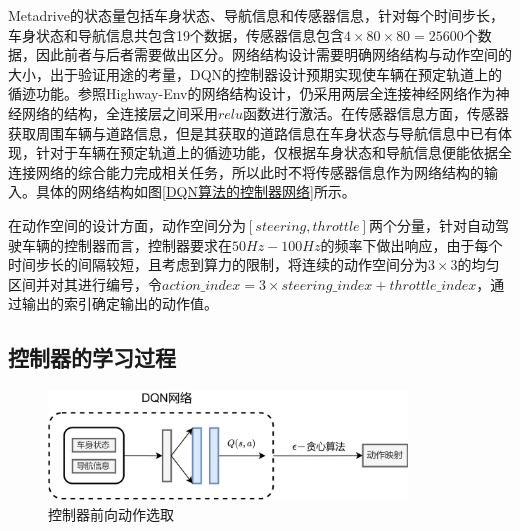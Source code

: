 Metadrive的状态量包括车身状态、导航信息和传感器信息，针对每个时间步长，车身状态和导航信息共包含19个数据，传感器信息包含$4\times80\times80=25600$个数据，因此前者与后者需要做出区分。网络结构设计需要明确网络结构与动作空间的大小，出于验证用途的考量，DQN的控制器设计预期实现使车辆在预定轨道上的循迹功能。参照Highway-Env的网络结构设计，仍采用两层全连接神经网络作为神经网络的结构，全连接层之间采用$relu$函数进行激活。在传感器信息方面，传感器获取周围车辆与道路信息，但是其获取的道路信息在车身状态与导航信息中已有体现，针对于车辆在预定轨道上的循迹功能，仅根据车身状态和导航信息便能依据全连接网络的综合能力完成相关任务，所以此时不将传感器信息作为网络结构的输入。具体的网络结构如图\ref{DQN算法的控制器网络}所示。

\begin{table}[htbp]
    \caption{控制器动作空间}\label{控制器动作空间}
    \centering
    \renewcommand\arraystretch{1.5}
\end{table}

在动作空间的设计方面，动作空间分为$[steering, throttle]$两个分量，针对自动驾驶车辆的控制器而言，控制器要求在$50Hz-100Hz$的频率下做出响应，由于每个时间步长的间隔较短，且考虑到算力的限制，将连续的动作空间分为$3 \times 3$的均匀区间并对其进行编号，令$action\_index = 3 \times steering\_index + throttle\_index$，通过输出的索引确定输出的动作值。

\subsection{控制器的学习过程}

\begin{figure}[htbp]
    \centering
    \includegraphics[width=0.85\textwidth]{images/chapter3/metadrive_forward.png}
    \caption{控制器前向动作选取}\label{控制器前向} %
\end{figure}  

